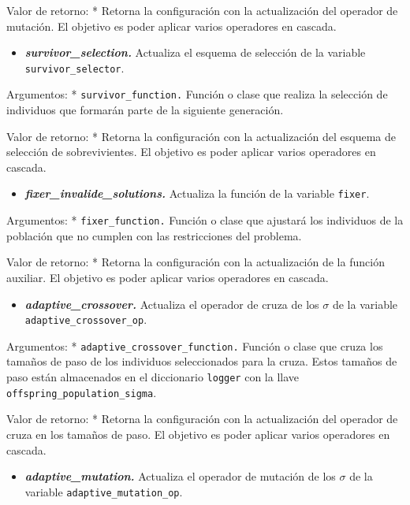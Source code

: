 \documentclass[11pt]{article}
\providecommand{\tightlist}{%
      \setlength{\itemsep}{0pt}\setlength{\parskip}{0pt}}
\begin{document}
Valor de retorno: * Retorna la configuración con la actualización del
operador de mutación. El objetivo es poder aplicar varios operadores en
cascada.

\begin{itemize}
\tightlist
\item
  \emph{\textbf{survivor\_selection.}} Actualiza el esquema de selección
  de la variable \texttt{survivor\_selector}.
\end{itemize}

Argumentos: * \texttt{survivor\_function.} Función o clase que realiza
la selección de individuos que formarán parte de la siguiente
generación.

Valor de retorno: * Retorna la configuración con la actualización del
esquema de selección de sobrevivientes. El objetivo es poder aplicar
varios operadores en cascada.

\begin{itemize}
\tightlist
\item
  \emph{\textbf{fixer\_invalide\_solutions.}} Actualiza la función de la
  variable \texttt{fixer}.
\end{itemize}

Argumentos: * \texttt{fixer\_function.} Función o clase que ajustará los
individuos de la población que no cumplen con las restricciones del
problema.

Valor de retorno: * Retorna la configuración con la actualización de la
función auxiliar. El objetivo es poder aplicar varios operadores en
cascada.

\begin{itemize}
\tightlist
\item
  \emph{\textbf{adaptive\_crossover.}} Actualiza el operador de cruza de
  los \(\sigma\) de la variable \texttt{adaptive\_crossover\_op}.
\end{itemize}

Argumentos: * \texttt{adaptive\_crossover\_function.} Función o clase
que cruza los tamaños de paso de los individuos seleccionados para la
cruza. Estos tamaños de paso están almacenados en el diccionario
\texttt{logger} con la llave \texttt{offspring\_population\_sigma}.

Valor de retorno: * Retorna la configuración con la actualización del
operador de cruza en los tamaños de paso. El objetivo es poder aplicar
varios operadores en cascada.

\begin{itemize}
\tightlist
\item
  \emph{\textbf{adaptive\_mutation.}} Actualiza el operador de mutación
  de los \(\sigma\) de la variable \texttt{adaptive\_mutation\_op}.
\end{itemize}
\end{document}
